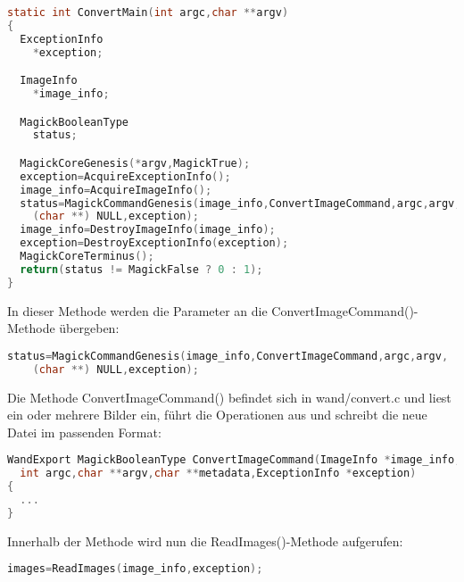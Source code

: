 \begin{lstlisting}[firstnumber=67, language=C, caption=utilities/convert.c ConvertMain(),label={lst:lstlisting}]
static int ConvertMain(int argc,char **argv)
{
  ExceptionInfo
    *exception;

  ImageInfo
    *image_info;

  MagickBooleanType
    status;

  MagickCoreGenesis(*argv,MagickTrue);
  exception=AcquireExceptionInfo();
  image_info=AcquireImageInfo();
  status=MagickCommandGenesis(image_info,ConvertImageCommand,argc,argv,
    (char **) NULL,exception);
  image_info=DestroyImageInfo(image_info);
  exception=DestroyExceptionInfo(exception);
  MagickCoreTerminus();
  return(status != MagickFalse ? 0 : 1);
}
\end{lstlisting}
\vspace{5mm}

In dieser Methode werden die Parameter an die ConvertImageCommand()-Methode übergeben:\\

\begin{lstlisting}[firstnumber=81, language=C, caption=utilities/convert.c Aufruf MagickCommandGenesis(),label={lst:lstlisting}]
  status=MagickCommandGenesis(image_info,ConvertImageCommand,argc,argv,
    (char **) NULL,exception);
\end{lstlisting}
\vspace{5mm}

Die Methode ConvertImageCommand() befindet sich in wand/convert.c und liest ein oder mehrere Bilder ein, führt die Operationen aus und schreibt die neue Datei im passenden Format:\\

\begin{lstlisting}[firstnumber=498, language=C, caption=wand/convert.c ConvertImageCommand(),label={lst:lstlisting}]
WandExport MagickBooleanType ConvertImageCommand(ImageInfo *image_info,
  int argc,char **argv,char **metadata,ExceptionInfo *exception)
{
  ...
}
\end{lstlisting}
\vspace{5mm}

Innerhalb der Methode wird nun die ReadImages()-Methode aufgerufen:\\

\begin{lstlisting}[firstnumber=628, language=C, caption=wand/convert.c Aufruf ReadImages(),label={lst:lstlisting}]
  images=ReadImages(image_info,exception);
\end{lstlisting}
\vspace{5mm}

